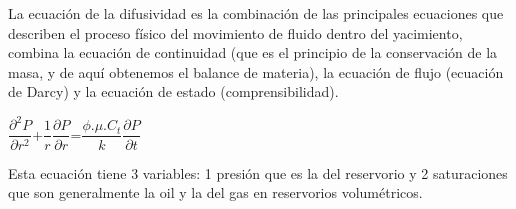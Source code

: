 \documentclass[10pt,a4paper]{report}
\begin{document}
La ecuación de la difusividad es la combinación de las principales ecuaciones que describen el proceso físico del movimiento de fluido dentro del yacimiento, combina la ecuación de continuidad (que es el principio de la conservación de la masa, y de aquí obtenemos el balance de materia), la ecuación de flujo (ecuación de Darcy) y la ecuación de estado (comprensibilidad).\\

\begin{center}
$\dfrac{\partial^{2}P}{\partial r^{2}}$+$\dfrac{1}{r}\dfrac{\partial P}{\partial r}$=$\dfrac{\phi.\mu.C_{t}}{k}\dfrac{\partial P}{\partial t}$
\end{center}
\bigskip
Esta ecuación tiene 3 variables: 1 presión que es la del reservorio y 2 saturaciones que son generalmente la oil y la del gas en reservorios volumétricos.\\
\end{document}
